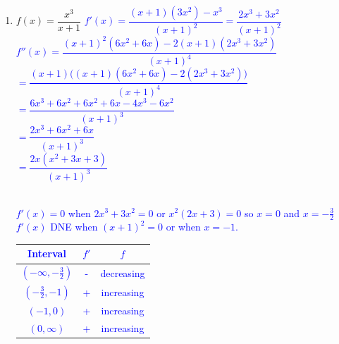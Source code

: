 \documentclass{ximera}
\begin{document}
\begin{exercise}
\begin{enumerate}
    \item $f(x)=\dfrac{x^3}{x+1}$
      \textcolor{blue}{$f'(x)=\dfrac{(x+1)(3x^2)-x^3}{(x+1)^2}=\dfrac{2x^3+3x^2}{(x+1)^2}$\\
    $f''(x)=\dfrac{(x+1)^2(6x^2+6x)-2(x+1)(2x^3+3x^2)}{(x+1)^4}$\\
    $=\dfrac{(x+1)\big((x+1)(6x^2+6x)-2(2x^3+3x^2)\big)}{(x+1)^4}$\\
    $=\dfrac{6x^3+6x^2+6x^2+6x-4x^3-6x^2}{(x+1)^3}$\\
    $=\dfrac{2x^3+6x^2+6x}{(x+1)^3}$\\
    $=\dfrac{2x(x^2+3x+3)}{(x+1)^3}$\\}
    \\
    \textcolor{blue}{
    $f'(x)=0$ when $2x^3+3x^2=0$ or $x^2(2x+3)=0$ so $x=0$ and $x=-\frac{3}{2}$\\
    $f'(x)$ DNE when $(x+1)^2=0$ or when $x=-1$.\\
    \begin{tabular}{c|c|c}
        Interval & $f'$ & $f$\\ \hline
       $(-\infty,-\frac32)$  & - & decreasing  \\
       $(-\frac32,-1)$ & + & increasing \\
       $(-1, 0)$ & + & increasing \\
       $(0,\infty)$ & + & increasing
    \end{tabular}}
    

\end{enumerate}
\end{exercise}
\end{document}
